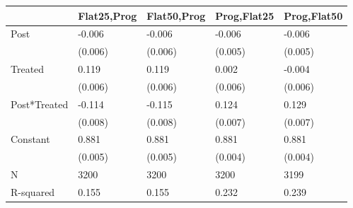 \begin{tabular}{lllll}
\toprule
 & Flat25,Prog & Flat50,Prog & Prog,Flat25 & Prog,Flat50 \\
\midrule
Post & -0.006 & -0.006 & -0.006 & -0.006 \\
 & (0.006) & (0.006) & (0.005) & (0.005) \\
Treated & 0.119 & 0.119 & 0.002 & -0.004 \\
 & (0.006) & (0.006) & (0.006) & (0.006) \\
Post*Treated & -0.114 & -0.115 & 0.124 & 0.129 \\
 & (0.008) & (0.008) & (0.007) & (0.007) \\
Constant & 0.881 & 0.881 & 0.881 & 0.881 \\
 & (0.005) & (0.005) & (0.004) & (0.004) \\
N & 3200 & 3200 & 3200 & 3199 \\
R-squared & 0.155 & 0.155 & 0.232 & 0.239 \\
\bottomrule
\end{tabular}
